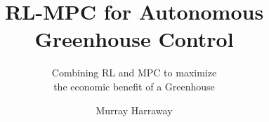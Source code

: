 \documentclass{tudelft-report}
\theoremstyle{remark}
\begin{document}
\frontmatter

\title{RL-MPC for Autonomous Greenhouse Control}
\subtitle{Combining RL and MPC to maximize  \\ the economic benefit of a Greenhouse}
\author{Murray Harraway}

\subject{Systems and Control Masters Thesis} %

\makecover


% 



\tableofcontents




\mainmatter





 


 



\setcounter{biburlnumpenalty}{7000}
\setcounter{biburllcpenalty}{7000}
\setcounter{biburlucpenalty}{7000}

\printbibliography[heading=bibintoc,title=References]


\appendix



\end{document}
